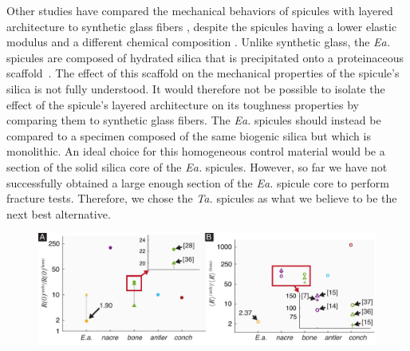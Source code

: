 \documentclass[12pt,onecolumn]{article}
\makeatletter
\newcommand{\TA}{\textit{Ta.\@}\xspace}
\newcommand{\EA}{\textit{Ea.\@}\xspace}
\makeatother
\begin{document}
\begin{bibunit}
Other studies have compared the mechanical behaviors of spicules with layered architecture to synthetic glass fibers \cite{johnson2010influence,levi1989remarkably,walter2007mechanisms,weaver2010unifying,mayer2005rigid}, despite the spicules having a lower elastic modulus and a different chemical composition \cite{arasuna2018structural, weaver2010unifying, woesz2006micromechanical}. Unlike synthetic glass, the \EA spicules are composed of hydrated silica that is precipitated onto a proteinaceous scaffold~\cite{ehrlich2010chitin}. The effect of this scaffold on the mechanical properties of the spicule's silica is not fully understood. It would therefore not be possible to isolate the effect of the spicule's layered architecture on its toughness properties by comparing them to synthetic glass fibers. The \EA spicules should instead be compared to a specimen composed of the same biogenic silica but which is monolithic. An ideal choice for this homogeneous control material would be a section of the solid silica core of the \EA spicules. However, so far we have not successfully obtained a large enough section of the \EA spicule core to perform fracture tests. Therefore, we chose the \TA spicules as what we believe to be the next best alternative.
%
			\begin{figure}[ht!]
			\centering
			\includegraphics[width=\textwidth]{../Figures/FigureSBMcomp/Figure6_V4.pdf}
			\caption{
}
\end{figure}
\end{bibunit}
\end{document}
